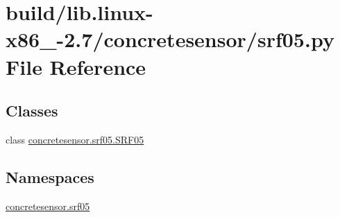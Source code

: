 \hypertarget{build_2lib_8linux-x86__64-2_87_2concretesensor_2srf05_8py}{}\section{build/lib.linux-\/x86\+\_-\/2.7/concretesensor/srf05.py File Reference}
\label{build_2lib_8linux-x86__64-2_87_2concretesensor_2srf05_8py}
\subsection*{Classes}
\begin{DoxyCompactItemize}
\item 
class \hyperlink{classconcretesensor_1_1srf05_1_1SRF05}{concretesensor.\+srf05.\+S\+R\+F05}
\end{DoxyCompactItemize}
\subsection*{Namespaces}
\begin{DoxyCompactItemize}
\item 
 \hyperlink{namespaceconcretesensor_1_1srf05}{concretesensor.\+srf05}
\end{DoxyCompactItemize}

